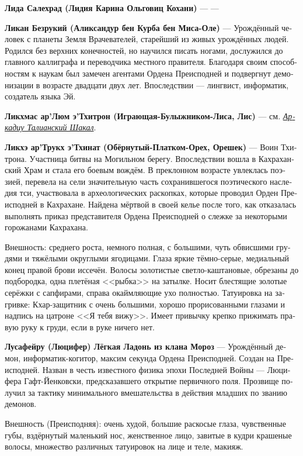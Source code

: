 \documentclass[a4paper,12pt,fleqn]{book}\usepackage{cooltooltips}\usepackage{polyglossia}\setdefaultlanguage[babelshorthands=true]{russian}\setotherlanguage{english}\defaultfontfeatures{Ligatures=TeX,Mapping=tex-text} \usepackage{xcolor}\definecolor{lightgray}{HTML}{bbbbbb}\color{lightgray}\newcommand{\ml}[3]{\textenglish{\textcolor{black}{#3}}}
\newcommand{\theterm}[3]{\textbf{\hypertarget{#1}{#2}} --- #3}
\newcommand{\thesynonim}[3]{\textbf{#2} --- см. \textit{\hyperlink{#1}{#3}}.}
\begin{document}
{\theterm{lida}
{Лида Салехрад (Лидия Карина Ольговиц Кохани)}
{---}

\theterm{lican}
{Ликан Безрукий (Аликсандур бен Курба бен Миса-Оле)}
{Урождённый человек с планеты Земля Врачевателей, старейший из живых урождённых людей.
Родился без верхних конечностей, но научился писать ногами, дослужился до главного каллиграфа и переводчика местного правителя.
Благодаря своим способностям к наукам был замечен агентами Ордена Преисподней и подвергнут демонизации в возрасте двадцати двух лет.
Впоследствии --- лингвист, информатик, создатель языка Эй.}

\thesynonim{arcadiju}
{Ликхмас ар’Люм э’Тхитрон (Играющая-Булыжником-Лиса, Лис)}
{Аркадиу Талианский Шакал}

\theterm{likchoe} %
{Ликхэ ар’Трукх э’Тхинат (Обёрнутый-Платком-Орех, Орешек)}
{Воин Тхитрона.
Участница битвы на Могильном берегу.
Впоследствии вошла в Кахраханский Храм и стала его боевым вождём.
В преклонном возрасте увлеклась поэзией, перевела на сели значительную часть сохранившегося поэтического наследия тси, участвовала в археологических раскопках, которые проводил Орден Преисподней в Кахрахане.
Найдена мёртвой в своей келье после того, как отказалась выполнять приказ представителя Ордена Преисподней о слежке за некоторыми горожанами Кахрахана.

Внешность: среднего роста, немного полная, с большими, чуть обвисшими грудями и тяжёлыми округлыми ягодицами.
Глаза яркие тёмно-серые, медиальный конец правой брови иссечён.
Волосы золотистые светло-каштановые, обрезаны до подбородка, одна плетёная <<рыбка>> на затылке.
Носит блестящие золотые серёжки с сапфирами, справа окаймляющие ухо полностью.
Татуировка на загривке: Кхар-защитник с очень большими, хорошо прорисованными глазами и надпись на цатроне <<Я тебя вижу>>.
Имеет привычку крепко прижимать правую руку к груди, если в руке ничего нет.}

\theterm{lusafejru} %
{Лусафейру (Люцифер) Лёгкая Ладонь из клана Мороз}
{Урождённый демон, информатик-когитор, максим секунда Ордена Преисподней.
Создан на Преисподней.
Назван в честь известного физика эпохи Последней Войны --- Люцифера Гафт-Йенковски, предсказавшего открытие первичного поля.
Прозвище получил за тактику минимального вмешательства в действия младших по званию демонов.

Внешность (Преисподняя): очень худой, большие раскосые глаза, чувственные губы, вздёрнутый маленький нос, женственное лицо, завитые в кудри крашеные волосы, множество различных татуировок на лице и теле, макияж.}

}
\end{document}
